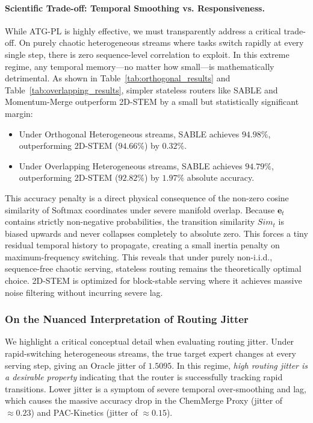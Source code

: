 \paragraph{Scientific Trade-off: Temporal Smoothing vs. Responsiveness.}
While ATG-PL is highly effective, we must transparently address a critical trade-off. On purely chaotic heterogeneous streams where tasks switch rapidly at every single step, there is zero sequence-level correlation to exploit. In this extreme regime, any temporal memory---no matter how small---is mathematically detrimental. As shown in Table~\ref{tab:orthogonal_results} and Table~\ref{tab:overlapping_results}, simpler stateless routers like SABLE and Momentum-Merge outperform 2D-STEM by a small but statistically significant margin:
\begin{itemize}
    \item Under Orthogonal Heterogeneous streams, SABLE achieves $94.98\%$, outperforming 2D-STEM ($94.66\%$) by $0.32\%$.
    \item Under Overlapping Heterogeneous streams, SABLE achieves $94.79\%$, outperforming 2D-STEM ($92.82\%$) by $1.97\%$ absolute accuracy.
\end{itemize}
This accuracy penalty is a direct physical consequence of the non-zero cosine similarity of Softmax coordinates under severe manifold overlap. Because $\mathbf{e}_t$ contains strictly non-negative probabilities, the transition similarity $Sim_t$ is biased upwards and never collapses completely to absolute zero. This forces a tiny residual temporal history to propagate, creating a small inertia penalty on maximum-frequency switching. This reveals that under purely non-i.i.d., sequence-free chaotic serving, stateless routing remains the theoretically optimal choice. 2D-STEM is optimized for block-stable serving where it achieves massive noise filtering without incurring severe lag.

\subsubsection{On the Nuanced Interpretation of Routing Jitter}
We highlight a critical conceptual detail when evaluating routing jitter. Under rapid-switching heterogeneous streams, the true target expert changes at every serving step, giving an Oracle jitter of $1.5095$. In this regime, \emph{high routing jitter is a desirable property} indicating that the router is successfully tracking rapid transitions. Lower jitter is a symptom of severe temporal over-smoothing and lag, which causes the massive accuracy drop in the ChemMerge Proxy (jitter of $\approx 0.23$) and PAC-Kinetics (jitter of $\approx 0.15$). 

